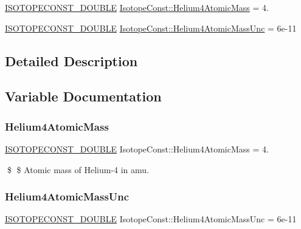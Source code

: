 \begin{DoxyCompactItemize}
\item 
\mbox{\hyperlink{group___isotope_const-_macros_ga8f45a7272ce02c0b4c65c44636ed719a}{I\+S\+O\+T\+O\+P\+E\+C\+O\+N\+S\+T\+\_\+\+D\+O\+U\+B\+LE}} \mbox{\hyperlink{group___isotope_const-_helium-_he4_ga42463df1dbf4b34b09367c420489ea3f}{Isotope\+Const\+::\+Helium4\+Atomic\+Mass}} = 4.
\item 
\mbox{\hyperlink{group___isotope_const-_macros_ga8f45a7272ce02c0b4c65c44636ed719a}{I\+S\+O\+T\+O\+P\+E\+C\+O\+N\+S\+T\+\_\+\+D\+O\+U\+B\+LE}} \mbox{\hyperlink{group___isotope_const-_helium-_he4_ga21f4ba3dac0dd6841583d1c2608e096a}{Isotope\+Const\+::\+Helium4\+Atomic\+Mass\+Unc}} = 6e-\/11
\end{DoxyCompactItemize}


\subsection{Detailed Description}


\subsection{Variable Documentation}
\mbox{\label{group___isotope_const-_helium-_he4_ga42463df1dbf4b34b09367c420489ea3f}} 
\subsubsection{\texorpdfstring{Helium4\+Atomic\+Mass}{Helium4AtomicMass}}
{\footnotesize\ttfamily \mbox{\hyperlink{group___isotope_const-_macros_ga8f45a7272ce02c0b4c65c44636ed719a}{I\+S\+O\+T\+O\+P\+E\+C\+O\+N\+S\+T\+\_\+\+D\+O\+U\+B\+LE}} Isotope\+Const\+::\+Helium4\+Atomic\+Mass = 4.}

\$ \$ Atomic mass of Helium-\/4 in amu. \mbox{\label{group___isotope_const-_helium-_he4_ga21f4ba3dac0dd6841583d1c2608e096a}} 
\subsubsection{\texorpdfstring{Helium4\+Atomic\+Mass\+Unc}{Helium4AtomicMassUnc}}
{\footnotesize\ttfamily \mbox{\hyperlink{group___isotope_const-_macros_ga8f45a7272ce02c0b4c65c44636ed719a}{I\+S\+O\+T\+O\+P\+E\+C\+O\+N\+S\+T\+\_\+\+D\+O\+U\+B\+LE}} Isotope\+Const\+::\+Helium4\+Atomic\+Mass\+Unc = 6e-\/11}

